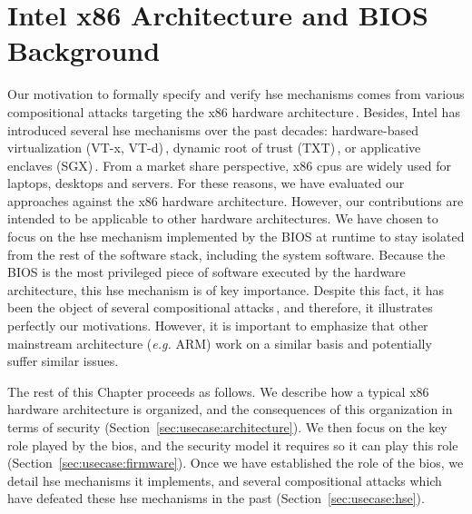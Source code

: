 \chapter{Intel x86 Architecture and BIOS Background}
\label{chapter:usecase}


\vspace{1cm}\noindent
%
Our motivation to formally specify and verify \ac{hse} mechanisms comes from
various compositional attacks targeting the x86 hardware
architecture\,\cite{duflot2009smram,wojtczuk2009smram,kallenberg2015racecondition,domas2015sinkhole,kovah2015senter}.
%
Besides, Intel has introduced several \ac{hse} mechanisms over the past decades:
hardware-based virtualization (VT-x, VT-d)\,\cite[Volume 3, Chapter
23]{intel2014manual}, dynamic root of trust (TXT)\,\cite{intel2015txt}, or
applicative enclaves (SGX)\,\cite[Volume 3, Chapter
36]{intel2014manual}\cite{costan2016sgxexplained}.
%
From a market share perspective, x86 \acp{cpu} are widely used for laptops,
desktops and servers.
%
For these reasons, we have evaluated our approaches against the x86 hardware
architecture.
%
However, our contributions are intended to be applicable to other hardware
architectures.
%
We have chosen to focus on the \ac{hse} mechanism implemented by the BIOS at
runtime to stay isolated from the rest of the software stack, including the
system software.
%
Because the BIOS is the most privileged piece of software executed by the
hardware architecture, this \ac{hse} mechanism is of key importance.
%
Despite this fact, it has been the object of several compositional
attacks\,\cite{duflot2009smram,wojtczuk2009smram,domas2015sinkhole}, and
therefore, it illustrates perfectly our motivations.
%
However, it is important to emphasize that other mainstream architecture
(\emph{e.g.}  ARM) work on a similar basis and potentially suffer similar
issues.

The rest of this Chapter proceeds as follows.
%
We describe how a typical x86 hardware architecture is organized, and the
consequences of this organization in terms of security
(Section~\ref{sec:usecase:architecture}).
%
We then focus on the key role played by the \ac{bios}, and the security model it
requires so it can play this role (Section~\ref{sec:usecase:firmware}).
%
Once we have established the role of the \ac{bios}, we detail \ac{hse}
mechanisms it implements, and several compositional attacks which have defeated
these \ac{hse} mechanisms in the past (Section~\ref{sec:usecase:hse}).

